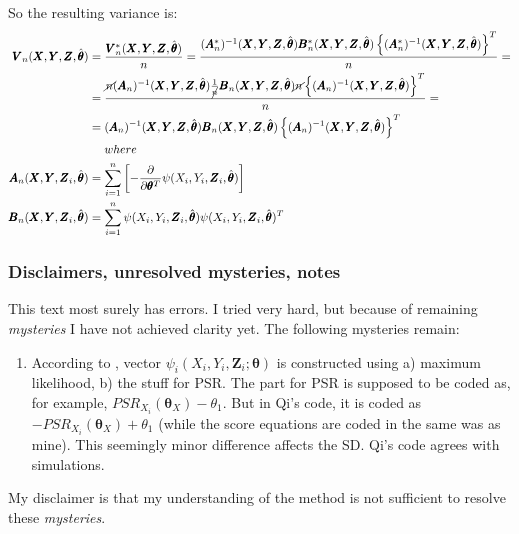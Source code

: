 \documentclass[]{article}
\begin{document}
So the resulting variance is:
	$$
	\begin{aligned}
		\pmb{V}_n(\pmb{X}, \pmb{Y}, \pmb{Z}, \hat{\pmb{\theta}}) &= \frac{\pmb{V}^*_n(\pmb{X}, \pmb{Y}, \pmb{Z}, \hat{\pmb{\theta}})}{n} = \frac{(\pmb{A}_n^*)^{-1}(\pmb{X}, \pmb{Y}, \pmb{Z}, \hat{\pmb{\theta}}) \pmb{B}^*_n(\pmb{X}, \pmb{Y}, \pmb{Z}, \hat{\pmb{\theta}})  \left\{(\pmb{A}_n^*)^{-1}(\pmb{X}, \pmb{Y}, \pmb{Z}, \hat{\pmb{\theta}}) \right\}^T}{n} = \\
    &=\frac{\cancel{n}(\pmb{A}_n)^{-1}(\pmb{X}, \pmb{Y}, \pmb{Z}, \hat{\pmb{\theta}})\frac{1}{\cancel{n}} \pmb{B}_n(\pmb{X}, \pmb{Y}, \pmb{Z}, \hat{\pmb{\theta}})  \cancel{n}\left\{(\pmb{A}_n)^{-1}(\pmb{X}, \pmb{Y}, \pmb{Z}, \hat{\pmb{\theta}}) \right\}^T}{n} = \\
    &=(\pmb{A}_n)^{-1}(\pmb{X}, \pmb{Y}, \pmb{Z}, \hat{\pmb{\theta}}) \pmb{B}_n(\pmb{X}, \pmb{Y}, \pmb{Z}, \hat{\pmb{\theta}})  \left\{(\pmb{A}_n)^{-1}(\pmb{X}, \pmb{Y}, \pmb{Z}, \hat{\pmb{\theta}}) \right\}^T\\
    &~~~~where\\
		\pmb{A}_n(\pmb{X}, \pmb{Y}, \pmb{Z}_i, \hat{\pmb{\theta}}) &=  \sum_{i = 1}^{n}\left[ -\frac{\partial}{\partial \pmb{\theta}^T}\psi(X_i, Y_i, \pmb{Z}_i, \hat{\pmb{\theta}}) \right]\\
		\pmb{B}_n(\pmb{X}, \pmb{Y}, \pmb{Z}_i, \hat{\pmb{\theta}}) &=  \sum_{i = 1}^{n} \psi(X_i, Y_i, \pmb{Z}_i, \hat{\pmb{\theta}}) \psi(X_i, Y_i, \pmb{Z}_i, \hat{\pmb{\theta}})^T\\
 	\end{aligned}
	$$
  
\subsubsection{Disclaimers, unresolved mysteries, notes}
This text most surely has errors. I tried very hard, but because of remaining \emph{mysteries} I have not achieved clarity yet. The following mysteries remain:
\begin{enumerate}[1)]
  \item According to \cite{stefanski2002calculus}, vector $\psi_i(X_i, Y_i, \pmb{Z}_i; \pmb{\theta})$ is constructed using a) maximum likelihood, b) the stuff for PSR. The part for PSR is supposed to be coded as, for example, $PSR_{X_{i}}(\pmb{\theta}_X) -\theta_1$. But in Qi's code, it is coded as $-PSR_{X_{i}}(\pmb{\theta}_X) +\theta_1$ (while the score equations are coded in the same was as mine). This seemingly minor difference affects the SD. Qi's code agrees with simulations.
\end{enumerate}
My disclaimer is that my understanding of the method is not sufficient to resolve these \emph{mysteries}.\\
\end{document}
